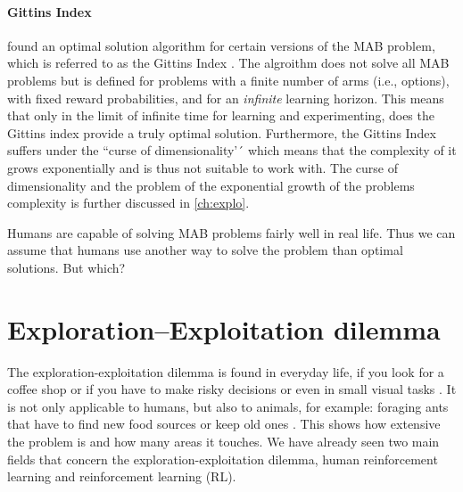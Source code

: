 \paragraph{Gittins Index}
\cite{gittins1979bandit} found an optimal solution algorithm for certain versions of the MAB problem, which is referred to as the Gittins Index \citep{gittins1979bandit}. The algroithm does not solve all MAB problems but is 
defined for problems with a finite number of arms (i.e., options), with fixed reward probabilities, and for an \textit{infinite} learning horizon.
This means that only in the limit of infinite time for learning and experimenting, does the Gittins index provide a truly optimal solution. Furthermore, the Gittins Index suffers under the ``curse of dimensionality'´ which means that the complexity of it grows exponentially and is thus not suitable to work with. The curse of dimensionality and the problem of the exponential growth of the problems complexity is further discussed in \ref{ch:explo}. 


Humans are capable of solving MAB problems fairly well in real life. Thus we can assume that humans use another way to solve the problem than optimal solutions. But which?   


\section{Exploration--Exploitation dilemma}
The exploration-exploitation dilemma is found in everyday life, if you look for a coffee shop or if you have to make risky decisions \citep{gonzalez2011instance, analytis2019make, schulz2018generalization} or even in small visual tasks \citep{chun1996just}. It is not only applicable to humans, but also to animals, for example: foraging ants that have to find new food sources or keep old ones \citep{cook2013exploration}. 
This shows how extensive the problem is and how many areas it touches. We have already seen two main fields that concern the exploration-exploitation dilemma, human reinforcement learning and reinforcement learning (RL).  


